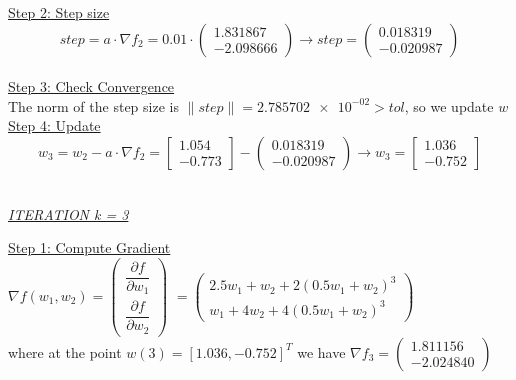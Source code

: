 \underline{Step 2: Step size}
\[
step = a \cdot \nabla f_{2} = 0.01 \cdot \left(\begin{array}{c}
	1.831867 \\
   -2.098666
\end{array}\right) \rightarrow step =\left(\begin{array}{c}
	0.018319 \\
	-0.020987
\end{array}\right)
\]
\\[4mm]

\underline{Step 3: Check Convergence}\\
The norm of the step size is $\| step \| = \num{2.785702e-02} > tol$, so we update $w$
\\[4mm]

\underline{Step 4: Update}
\[ 
w_3 = w_2 - a\cdot \nabla f_2 =  \left[\begin{array}{c}
	1.054 \\
	-0.773
\end{array}\right] - \left(\begin{array}{c}
	0.018319 \\
-0.020987
\end{array}\right) \rightarrow
w_3 = \left[\begin{array}{c}
	1.036\\
	-0.752
\end{array}\right]
\]
\\[4mm]

\begin{center}
	\underline{\textit{ITERATION k = 3}}
\end{center}

\underline{Step 1: Compute Gradient}\\
\(\nabla f(w_1,w_2) = \left(\begin{array}{c}
	\dfrac{\partial f}{\partial w_1} \\[4mm]
	\dfrac{\partial f}{\partial w_2}
\end{array}\right)\) $= \left(\begin{array}{c}
	2.5w_1 + w_2 + 2(0.5w_1+w_2)^3\\[1mm]
	w_1 + 4w_2 + 4(0.5w_1+w_2)^3
\end{array}\right)$ \\[3mm]

where at the point $w\left(3\right) = \left[1.036, -0.752\right]^T$ we have $\nabla f_{3} = \left(\begin{array}{c}
	1.811156 \\
	-2.024840
\end{array}\right)$
\\[4mm]

